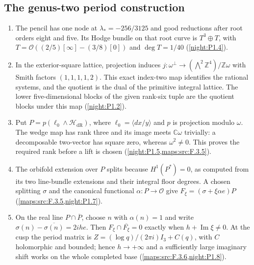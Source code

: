 \subsection{The genus-two period construction}
\RungOne
\begin{enumerate}[label=\arabic*.]
\item The pencil has one node at $\lambda_*=-256/3125$ and good
  reductions after root orders eight and five.  Its Hodge bundle on
  that root curve is $T^3\oplus T$, with
  $T=\mathcal O((2/5)[\infty]-(3/8)[0])$ and
  $\deg T=1/40$ (\cref{night:P1.4}).
\item In the exterior-square lattice, projection induces
  $j:\omega^\perp\to(\bigwedge^2\mathbb Z^4)/\mathbb Z\omega$
  with Smith factors $(1,1,1,1,2)$.  This exact index-two map identifies
  the rational systems, and the quotient is the dual of the primitive
  integral lattice.  The lower five-dimensional blocks of the given
  rank-six tuple are the quotient blocks under this map
  (\cref{night:P1.2}).
\item Put $P=p(\ell_0\wedge\mathcal H_{\mathrm{dR}})$, where
  $\ell_0=\langle dx/y\rangle$ and $p$ is projection modulo $\omega$.
  The wedge map has rank three and its image meets $\mathbb C\omega$
  trivially: a decomposable two-vector has square zero, whereas
  $\omega^2\ne0$.  This proves the required rank before a lift is
  chosen (\cref{night:P1.5,maps:src:F.3.5}).
\item The orbifold extension over $P$ splits because
  $H^1(P^*)=0$, as computed from its two line-bundle extensions and
  their integral floor degrees.  A chosen splitting $\sigma$ and
  the canonical functional $\alpha:P\to\mathcal O$ give
  $F_\xi=(\sigma+\xi\alpha e)P$
  (\cref{maps:src:F.3.5,night:P1.7}).
\item On the real line $P\cap\overline P$, choose $n$ with
  $\alpha(n)=1$ and write
  $\sigma(n)-\overline{\sigma(n)}=2ih e$.
  Then $F_\xi\cap\overline{F_\xi}=0$ exactly when
  $h+\operatorname{Im}\xi\ne0$.  At the cusp the period matrix is
  $Z=(\log q)/(2\pi i)I_3+C(q)$, with $C$ holomorphic and bounded;
  hence $h\to+\infty$ and a sufficiently large imaginary shift
  works on the whole completed base
  (\cref{maps:src:F.3.6,night:P1.8}).
\end{enumerate}

